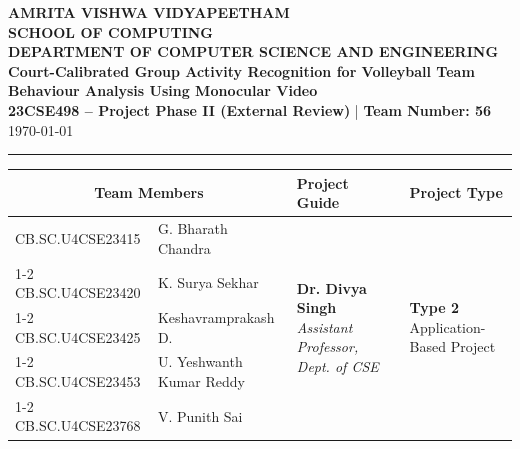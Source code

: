 \documentclass[11pt, a4paper]{article}
\begin{document}
\noindent
\begin{minipage}{\textwidth}
    \centering
    {\Large \textbf{\textcolor{amritaMaroon}{
    AMRITA VISHWA VIDYAPEETHAM \\
    SCHOOL OF COMPUTING \\
    DEPARTMENT OF COMPUTER SCIENCE AND ENGINEERING \\
    }}}
    \vspace{0.2cm}
    {\large \textbf{Court-Calibrated Group Activity Recognition for Volleyball Team Behaviour Analysis Using Monocular Video}} \\[0.1cm]
    \textbf{23CSE498 -- Project Phase II (External Review)} \quad | \quad \textbf{Team Number: 56} \\
    \today
\end{minipage}

\vspace{0.3cm}
\hrule
\vspace{0.3cm}

\noindent
\begin{center}
    \renewcommand{\arraystretch}{1.45}
    \setlength{\tabcolsep}{6pt}
    \begin{tabular}{|l|p{4.8cm}|p{4.6cm}|p{3.2cm}|}
        \hline
        \multicolumn{2}{|c|}{\textbf{Team Members}} & \textbf{Project Guide} & \textbf{Project Type} \\
        \hline
        \small CB.SC.U4CSE23415 & \small G. Bharath Chandra &
        \multirow{5}{=}{\raggedright \small \textbf{Dr. Divya Singh} \newline \textit{Assistant Professor, \newline Dept. of CSE}} &
        \multirow{5}{=}{\raggedright \small \textbf{Type 2} \newline Application-Based Project} \\ \cline{1-2}
        \small CB.SC.U4CSE23420 & \small K. Surya Sekhar & & \\ \cline{1-2}
        \small CB.SC.U4CSE23425 & \small Keshavramprakash D. & & \\ \cline{1-2}
        \small CB.SC.U4CSE23453 & \small U. Yeshwanth Kumar Reddy & & \\ \cline{1-2}
        \small CB.SC.U4CSE23768 & \small V. Punith Sai & & \\
        \hline
    \end{tabular}
\end{center}
\vspace{0.2cm}
\end{document}

